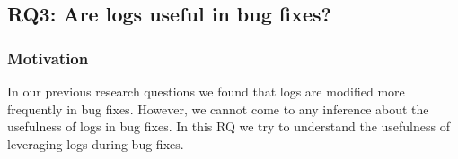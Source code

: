 \subsection*{\textbf{RQ3: Are logs useful in bug fixes?}}


\subsubsection*{\textbf{Motivation}}

In our previous research questions we found that logs are modified more frequently in bug fixes. However, we cannot come to any inference about the usefulness of logs in bug fixes. In this RQ we try  to understand the usefulness of leveraging logs during bug fixes.



